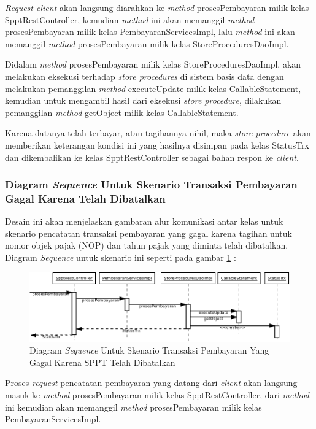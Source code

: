 \documentclass[pdftex,12pt, oneside]{article}
\begin{document}
\textit{Request client} akan langsung diarahkan ke \textit{method} prosesPembayaran milik kelas SpptRestController, kemudian \textit{method} ini akan memanggil \textit{method} prosesPembayaran milik kelas PembayaranServicesImpl, lalu \textit{method} ini akan memanggil \textit{method} prosesPembayaran milik kelas StoreProceduresDaoImpl.

Didalam \textit{method} prosesPembayaran milik kelas StoreProceduresDaoImpl, akan melakukan eksekusi terhadap \textit{store procedures} di sistem basis data dengan melakukan pemanggilan \textit{method} executeUpdate milik kelas CallableStatement, kemudian untuk mengambil hasil dari eksekusi \textit{store procedure}, dilakukan pemanggilan \textit{method} getObject milik kelas CallableStatement.

Karena datanya telah terbayar, atau tagihannya nihil, maka \textit{store procedure} akan memberikan keterangan kondisi ini yang hasilnya disimpan pada kelas StatusTrx dan dikembalikan ke kelas SpptRestController sebagai bahan respon ke \textit{client}.

\subsubsection{Diagram \textit{Sequence} Untuk Skenario Transaksi Pembayaran Gagal Karena Telah Dibatalkan}

Desain ini akan menjelaskan gambaran alur komunikasi antar kelas untuk skenario pencatatan transaksi pembayaran yang gagal karena tagihan untuk nomor objek pajak (NOP) dan tahun pajak yang diminta telah dibatalkan. Diagram \textit{Sequence} untuk skenario ini seperti pada gambar \ref{fig:uml-seq-trx-batal} :

\begin{figure}[H]
  \centering
  \includegraphics[width=1\textwidth]{./resources/uml/uml-seq-trx-batal}
  \caption{Diagram \textit{Sequence} Untuk Skenario Transaksi Pembayaran Yang Gagal Karena SPPT Telah Dibatalkan}
  \label{fig:uml-seq-trx-batal}
\end{figure}

Proses \textit{request} pencatatan pembayaran yang datang dari \textit{client} akan langsung masuk ke \textit{method} prosesPembayaran milik kelas SpptRestController, dari \textit{method} ini kemudian akan memanggil \textit{method} prosesPembayaran milik kelas PembayaranServicesImpl. 
\end{document}
